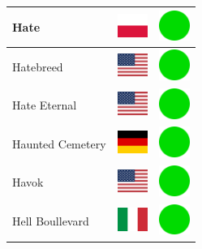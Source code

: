 \documentclass[12pt, a4paper, twoside]{report}
\begin{document}
\begin{center}
\begin{longtable}{|p{5cm}|p{2cm}|p{2cm}|}
			Hate & \includegraphics[width=1cm]{4x3/pl} & \includegraphics[width=1cm]{likes/y} \\ \hline
			Hatebreed & \includegraphics[width=1cm]{4x3/us} & \includegraphics[width=1cm]{likes/y} \\ \hline
			Hate Eternal & \includegraphics[width=1cm]{4x3/us} & \includegraphics[width=1cm]{likes/y} \\ \hline
			Haunted Cemetery & \includegraphics[width=1cm]{4x3/de} & \includegraphics[width=1cm]{likes/y} \\ \hline
			Havok & \includegraphics[width=1cm]{4x3/us} & \includegraphics[width=1cm]{likes/y} \\ \hline
			Hell Boullevard & \includegraphics[width=1cm]{4x3/it} & \includegraphics[width=1cm]{likes/y} \\ \hline

\end{longtable}
\end{center}
\end{document}
